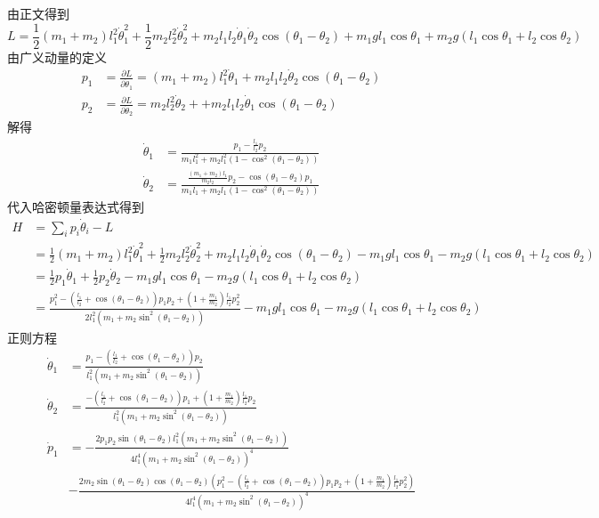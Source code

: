 \begin{solution}
    由正文得到
    $$L=\frac{1}{2}(m_1+m_2)l_1^2\dot \theta_1^2+\frac12m_2l_2^2\dot \theta_2^2+m_2l_1l_2\dot \theta_1\dot \theta_2\cos(\theta_1-\theta_2)+m_1gl_1\cos\theta_1+m_2g(l_1\cos\theta_1+l_2\cos\theta_2)$$
    由广义动量的定义
    \begin{align*}
        p_1&=\frac{\partial L}{\partial \dot\theta_1}=(m_1+m_2)l_1^2\dot\theta_1+m_2l_1l_2\dot\theta_2\cos(\theta_1-\theta_2)\\
        p_2&=\frac{\partial L}{\partial \dot\theta_2}=m_2l_2^2\dot\theta_2++m_2l_1l_2\dot\theta_1\cos(\theta_1-\theta_2)
    \end{align*}
    解得
    \begin{align*}
        \dot\theta_1&=\frac{p_1-\frac{l_1}{l_2}p_2}{m_1l_1^2+m_2l_1^2(1-\cos^2(\theta_1-\theta_2))}\\
        \dot\theta_2&=\frac{\frac{(m_1+m_2)l_1}{m_2l_2}p_2-\cos(\theta_1-\theta_2)p_1}{m_1l_1+m_2l_1(1-\cos^2(\theta_1-\theta_2))}
    \end{align*}
    代入哈密顿量表达式得到
    \begin{align*}
        H&=\sum_{i}p_{i}\dot\theta_i-L\\
         &=\frac{1}{2}(m_1+m_2)l_1^2\dot \theta_1^2+\frac12m_2l_2^2\dot \theta_2^2+m_2l_1l_2\dot \theta_1\dot \theta_2\cos(\theta_1-\theta_2)-m_1gl_1\cos\theta_1-m_2g(l_1\cos\theta_1+l_2\cos\theta_2)\\
         &=\frac12p_1\dot\theta_1+\frac12p_2\dot\theta_2-m_1gl_1\cos\theta_1-m_2g(l_1\cos\theta_1+l_2\cos\theta_2)\\
         &=\frac{p_1^2-(\frac{l_1}{l_2}+\cos(\theta_1-\theta_2))p_1p_2+(1+\frac{m_1}{m_2})\frac{l_1}{l_2}p_2^2}{2l_1^2(m_1+m_2\sin^2(\theta_1-\theta_2))}-m_1gl_1\cos\theta_1-m_2g(l_1\cos\theta_1+l_2\cos\theta_2)
    \end{align*}
    正则方程
    \begin{align*}
        \dot\theta_1&=\frac{p_1-(\frac{l_1}{l_2}+\cos(\theta_1-\theta_2))p_2}{l_1^2(m_1+m_2\sin^2(\theta_1-\theta_2))}\\
        \dot\theta_2&=\frac{-(\frac{l_1}{l_2}+\cos(\theta_1-\theta_2))p_1+(1+\frac{m_1}{m_2})\frac{l_1}{l_2}p_2}{l_1^2(m_1+m_2\sin^2(\theta_1-\theta_2))}\\
        \dot p_1&=-\frac{2p_1p_2\sin(\theta_1-\theta_2)l_1^2(m_1+m_2\sin^2(\theta_1-\theta_2))}{4l_1^4(m_1+m_2\sin^2(\theta_1-\theta_2))^4}\\
        &-\frac{2m_2\sin(\theta_1-\theta_2)\cos(\theta_1-\theta_2)(p_1^2-(\frac{l_1}{l_2}+\cos(\theta_1-\theta_2))p_1p_2+(1+\frac{m_1}{m_2})\frac{l_1}{l_2}p_2^2)}{4l_1^4(m_1+m_2\sin^2(\theta_1-\theta_2))^4}\\

\end{align*}
\end{solution}
